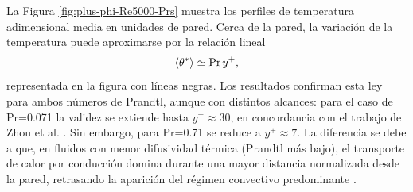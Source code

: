 %
% 



La Figura \ref{fig:plus-phi-Re5000-Prs} muestra los perfiles de temperatura adimensional media en unidades de pared. Cerca de la pared, la variación de la temperatura puede aproximarse por la relación lineal \cite{kawamura1998dns}
\begin{equation*}
\langle \theta^* \rangle \simeq \text{Pr}\hspace{0.5mm} y^+ ,
\end{equation*}
representada en la figura con líneas negras. Los resultados confirman esta ley para ambos números de Prandtl, aunque con distintos alcances: para el caso de Pr=0.071 la validez se extiende hasta $y^{+}\approx 30$, en concordancia con el trabajo de Zhou et al. \cite{zhou2024direct}. Sin embargo, para Pr=0.71 se reduce a $y^{+}\approx 7$. La diferencia se debe a que, en fluidos con menor difusividad térmica (Prandtl más bajo), el transporte de calor por conducción domina durante una mayor distancia normalizada desde la pared, retrasando la aparición del régimen convectivo predominante \cite{abregu2023dns}.






